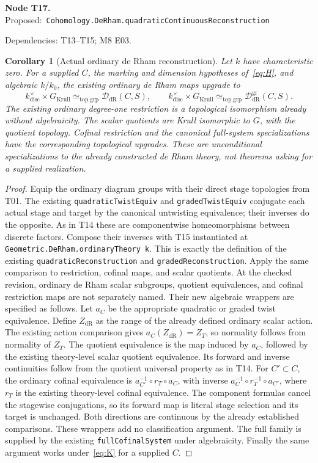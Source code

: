 \documentclass[11pt]{article}
\newtheorem{corollary}[theorem]{Corollary}
\theoremstyle{remark}\newtheorem{remark}[theorem]{Remark}
\newcommand{\D}{\mathcal D}
\newcommand{\DG}{\mathcal D^{\mathrm{gr}}}
\newcommand{\code}[1]{{\normalfont\nolinkurl{#1}}}
\newcommand{\node}[3]{\par\Needspace{8\baselineskip}\smallskip\noindent\textbf{Node #1.}\quad
 \textsf{Proposed:}\ \code{#2}\par\noindent
 \textsf{Dependencies:} #3.\par\smallskip}
\begin{document}
\node{T17}{Cohomology.DeRham.quadraticContinuousReconstruction}{T13--T15; M8 E03}
\begin{corollary}[Actual ordinary de Rham reconstruction]\label{cor:t17}
Let $k$ have characteristic zero. For a supplied $C$, the marking and
dimension hypotheses of~\eqref{eq:H}, and algebraic $k/k_0$, the
existing ordinary de Rham maps upgrade to
\[
 k^\times_{\mathrm{disc}}\times G_{\mathrm{Krull}}
       \simeq_{\mathrm{top.grp}}\D_{\mathrm{dR}}(C,S),\qquad
 k^\times_{\mathrm{disc}}\times G_{\mathrm{Krull}}
       \simeq_{\mathrm{top.grp}}\DG_{\mathrm{dR}}(C,S).
\]
The existing ordinary degree-one restriction is a topological
isomorphism already without algebraicity. The scalar quotients are
Krull isomorphic to $G$, with the quotient topology. Cofinal restriction
and the canonical full-system specializations have the corresponding
topological upgrades. These are unconditional specializations to
the already constructed de Rham theory, not theorems asking for a
supplied realization.
\end{corollary}
\begin{proof}
Equip the ordinary diagram groups with their direct stage topologies
from T01. The existing \code{quadraticTwistEquiv} and
\code{gradedTwistEquiv} conjugate each actual stage and target by the
canonical untwisting equivalence; their inverses do the opposite.
As in T14 these are componentwise homeomorphisms between discrete
factors. Compose their inverses with T15 instantiated at
\texttt{Geometric.DeRham.ordinaryTheory k}. This is exactly the
definition of the existing \code{quadraticReconstruction} and
\code{gradedReconstruction}. Apply the same comparison to restriction,
cofinal maps, and scalar quotients. At the checked revision, ordinary
de Rham scalar subgroups, quotient equivalences, and cofinal restriction
maps are not separately named. Their new algebraic wrappers are
specified as follows. Let $a_C$ be the appropriate quadratic or graded
twist equivalence. Define $Z_{\mathrm{dR}}$ as the range of the already
defined ordinary scalar action. The existing action comparison gives
$a_C(Z_{\mathrm{dR}})=Z_T$, so normality follows from normality of
$Z_T$. The quotient equivalence is the map induced by $a_C$, followed
by the existing theory-level scalar quotient equivalence. Its forward
and inverse continuities follow from the quotient universal property
as in T14. For $C'\subset C$, the ordinary cofinal equivalence is
$a_{C'}^{-1}\circ r_T\circ a_C$, with inverse
$a_C^{-1}\circ r_T^{-1}\circ a_{C'}$, where $r_T$ is the existing
theory-level cofinal equivalence. The component formulas cancel the
stagewise conjugations, so its forward map is literal stage selection
and its target is unchanged. Both directions are continuous by the
already established comparisons. These wrappers add no classification
argument. The full
family is supplied by the existing \code{fullCofinalSystem} under
algebraicity. Finally the same argument works under~\eqref{eq:K}
for a supplied $C$.
\end{proof}
\end{document}

